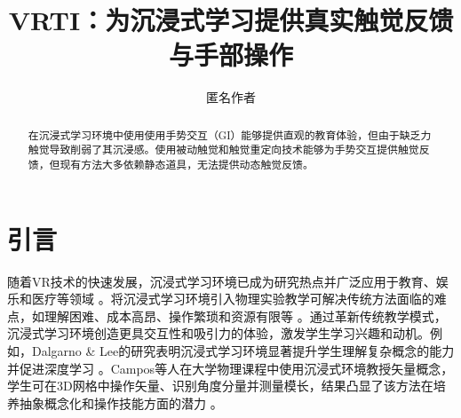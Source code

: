 \documentclass[runningheads]{llncs}
\begin{document}
\title{VRTI：为沉浸式学习提供真实触觉反馈与手部操作}

 


\author{匿名作者}

\maketitle


\begin{abstract}
在沉浸式学习环境中使用使用手势交互（GI）能够提供直观的教育体验，但由于缺乏力触觉导致削弱了其沉浸感。使用被动触觉和触觉重定向技术能够为手势交互提供触觉反馈，但现有方法大多依赖静态道具，无法提供动态触觉反馈。

\end{abstract}

\section{引言}
随着VR技术的快速发展，沉浸式学习环境已成为研究热点并广泛应用于教育、娱乐和医疗等领域 \cite{luo2020dream,yeung2021virtual}。将沉浸式学习环境引入物理实验教学可解决传统方法面临的难点，如理解困难、成本高昂、操作繁琐和资源有限等 \cite{yang2007impact,abu2018design}。通过革新传统教学模式，沉浸式学习环境创造更具交互性和吸引力的体验，激发学生学习兴趣和动机。例如，Dalgarno \& Lee的研究表明沉浸式学习环境显著提升学生理解复杂概念的能力并促进深度学习 \cite{dalgarno2010learning}。Campos等人在大学物理课程中使用沉浸式环境教授矢量概念，学生可在3D网格中操作矢量、识别角度分量并测量模长，结果凸显了该方法在培养抽象概念化和操作技能方面的潜力 \cite{campos2022impact}。
\end{document}
